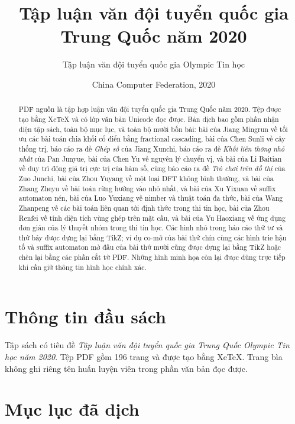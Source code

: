 \documentclass[11pt]{article}
\title{Tập luận văn đội tuyển quốc gia Trung Quốc năm 2020}
\author{Tập luận văn đội tuyển quốc gia Olympic Tin học}
\date{China Computer Federation, 2020}
\begin{document}
\maketitle


\renewcommand{\abstractname}{Tóm tắt}
\renewcommand{\figurename}{Hình}
\begin{abstract}
PDF nguồn là tập hợp luận văn đội tuyển quốc gia Trung Quốc năm 2020. Tệp được
tạo bằng XeTeX và có lớp văn bản Unicode đọc được. Bản dịch bao gồm
phần nhận diện tập sách, toàn bộ mục lục, và toàn bộ mười bốn bài: bài của Jiang
Mingrun về tối ưu các bài toán chia khối cổ điển bằng fractional cascading, bài
của Chen Sunli về cây thống trị, báo cáo ra đề \emph{Ghép số} của Jiang
Xunchi, báo cáo ra đề \emph{Khối liên thông nhỏ nhất} của Pan Junyue, bài của
Chen Yu về nguyên lý chuyển vị, và bài của Li Baitian về duy trì động giá trị
cực trị của hàm số, cùng báo cáo ra đề \emph{Trò chơi trên đồ thị} của Zuo
Junchi, bài của Zhou Yuyang về một loại DFT không bình thường, và bài của Zhang
Zheyu về bài toán rừng hướng vào nhỏ nhất, và bài của Xu Yixuan về suffix
automaton nén, bài của Luo Yuxiang về nimber và thuật toán đa thức, bài của
Wang Zhanpeng về các bài toán liên quan tới định thức trong thi tin học, bài
của Zhou Renfei về tính diện tích vùng ghép trên mặt cầu, và bài của Yu
Haoxiang về ứng dụng đơn giản của lý thuyết nhóm trong thi tin học. Các
hình nhỏ trong báo cáo thứ tư và thứ bảy được dựng lại bằng
TikZ; ví dụ co-mở của bài thứ chín cùng các hình trie hậu tố
và suffix automaton mở đầu của bài thứ mười cũng được dựng lại bằng TikZ hoặc
chèn lại bằng các phần cắt từ PDF. Những hình minh họa còn lại được dùng trực
tiếp khi cần giữ thông tin hình học chính xác.
\end{abstract}

\section{Thông tin đầu sách}

Tập sách có tiêu đề \emph{Tập luận văn đội tuyển quốc gia Trung Quốc Olympic
Tin học năm 2020}. Tệp PDF gồm 196 trang và được tạo bằng XeTeX. Trang bìa
không ghi riêng tên huấn luyện viên trong phần văn bản đọc được.

\section{Mục lục đã dịch}
\end{document}
